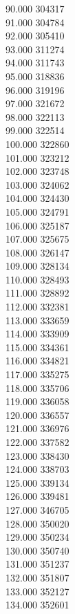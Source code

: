 { 90.000	304317 \\
 91.000	304784 \\
 92.000	305410 \\
 93.000	311274 \\
 94.000	311743 \\
 95.000	318836 \\
 96.000	319196 \\
 97.000	321672 \\
 98.000	322113 \\
 99.000	322514 \\
 100.000	322860 \\
 101.000	323212 \\
 102.000	323748 \\
 103.000	324062 \\
 104.000	324430 \\
 105.000	324791 \\
 106.000	325187 \\
 107.000	325675 \\
 108.000	326147 \\
 109.000	328134 \\
 110.000	328493 \\
 111.000	328892 \\
 112.000	332381 \\
 113.000	333659 \\
 114.000	333909 \\
 115.000	334361 \\
 116.000	334821 \\
 117.000	335275 \\
 118.000	335706 \\
 119.000	336058 \\
 120.000	336557 \\
 121.000	336976 \\
 122.000	337582 \\
 123.000	338430 \\
 124.000	338703 \\
 125.000	339134 \\
 126.000	339481 \\
 127.000	346705 \\
 128.000	350020 \\
 129.000	350234 \\
 130.000	350740 \\
 131.000	351237 \\
 132.000	351807 \\
 133.000	352127 \\
 134.000	352601 \\
}
